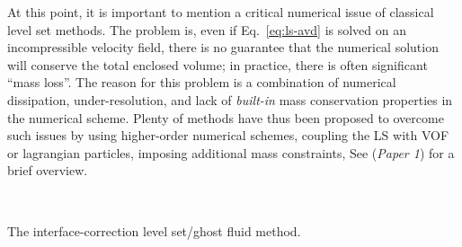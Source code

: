 At this point, it is important to mention a critical numerical issue of classical level set methods. The problem is, even if Eq.\ \eqref{eq:ls-avd} is solved on an incompressible velocity field, there is no guarantee that the numerical solution will conserve the total enclosed volume; in practice, there is often significant ``mass loss''.
The reason for this problem is a combination of numerical dissipation, under-resolution, and lack of \emph{built-in} mass conservation properties in the numerical scheme.
Plenty of methods have thus been proposed to overcome such issues by using higher-order numerical schemes, coupling the LS with VOF or lagrangian particles, imposing additional mass constraints, \etc See \cite{ICLS} (\emph{Paper 1}) for a brief overview.

\begin{algorithm}[t]
  \\
 \caption{The interface-correction level set/ghost fluid method.}
 \label{al:ls}
\end{algorithm}

